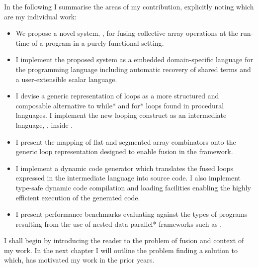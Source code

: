\documentclass[preamble.tex]{subfiles}
\begin{document}
In the following I summarise the areas of my contribution, explicitly noting which are my individual work:
\begin{itemize}

  \item We propose a novel system, \LiveFusion, for fusing collective array operations at the run-time of a program in a purely functional setting.

  \item I implement the proposed system as a embedded domain-specific language for the \Haskell programming language including automatic recovery of shared terms and a user-extensible scalar language.

  \item I devise a generic representation of loops as a more structured and composable alternative to \*while* and \*for* loops found in procedural languages. I implement the new looping construct as an intermediate language, \Loop, inside \LiveFusion.

  \item I present the mapping of flat and segmented array combinators onto the generic loop representation designed to enable fusion in the  framework.

  \item I implement a dynamic code generator which translates the fused loops expressed in the intermediate \Loop language into \Haskell source code. I also implement type-safe dynamic code compilation and loading facilities enabling the highly efficient execution of the generated code.

  \item I present performance benchmarks evaluating \LiveFusion against the types of programs resulting from the use of \*nested data parallel* frameworks such as .

\end{itemize}

I shall begin by introducing the reader to the problem of fusion and context of my work. In the next chapter I will outline the problem finding a solution to which, has motivated my work in the prior years.




\IfNotCompilingAll{}
\end{document}
